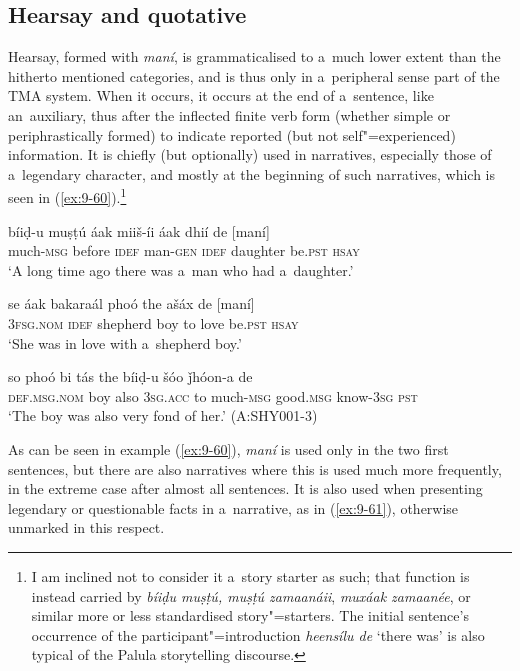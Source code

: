 \subsection{Hearsay and quotative}
\label{subsec:9-2-4}

Hearsay, formed with \textit{maní}, is grammaticalised to a~much lower extent than the hitherto mentioned categories, and is thus only in a~peripheral sense part of the TMA system. When it occurs, it occurs at the end of a~sentence, like an~auxiliary, thus after the inflected finite verb form (whether simple or periphrastically formed) to indicate reported (but not self"=experienced) information. It is chiefly (but optionally) used in narratives, especially those of a~legendary character, and mostly at the beginning of such narratives, which is seen in (\ref{ex:9-60}).\footnote{I am inclined not to consider it a~story starter as such; that function is instead carried by \textit{bíiḍu muṣṭú, muṣṭú zamaanáii}, \textit{muxáak zamaanée}, or similar more or less standardised story"=starters. The initial sentence's occurrence of the participant"=introduction \textit{heensílu de} `there was' is also typical of the Palula storytelling discourse.} 

\begin{exe}
\ex
\label{ex:9-60}
\gll \label{bkm:Ref190746425}bíiḍ-u muṣṭú áak miiš-íi áak dhií de [maní] \\
much-\textsc{msg} before \textsc{idef} man-\textsc{gen} \textsc{idef} daughter be.\textsc{pst}
\textsc{hsay} \\
\glt `A long time ago there was a~man who had a~daughter.' 

\gll se áak bakaraál phoó the ašáx de [maní] \\
\textsc{3fsg.nom} \textsc{idef} shepherd boy to love be.\textsc{pst} \textsc{hsay} \\
\glt `She was in love with a~shepherd boy.'

\gll so phoó bi tás the bíiḍ-u  šóo ǰhóon-a de \\
\textsc{def.msg.nom} boy also \textsc{3sg.acc} to much-\textsc{msg}  good.\textsc{msg} know-\textsc{3sg} \textsc{pst} \\
\glt `The boy was also very fond of her.' (A:SHY001-3)
\end{exe}

As can be seen in example (\ref{ex:9-60}), \textit{maní} is used only in the two first sentences, but there are also narratives where this is used much more frequently, in the extreme case after almost all sentences. It is also used when presenting legendary or questionable facts in a~narrative, as in (\ref{ex:9-61}), otherwise unmarked in this respect.

